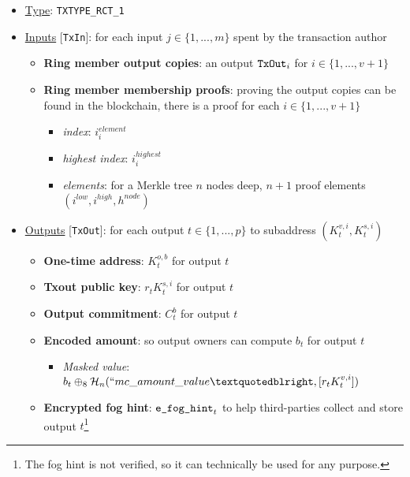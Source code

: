\begin{itemize}
    \item \underline{Type}: {\tt TXTYPE\_RCT\_1}
    \item \underline{Inputs} [{\tt TxIn}]: for each input $j \in \{1,...,m\}$ spent by the transaction author
    \begin{itemize}
        \item \textbf{Ring member output copies}: an output $\textrm{{\tt TxOut}}_i$ for $i \in \{1,...,v+1\}$
        \item \textbf{Ring member membership proofs}: proving the output copies can be found in the blockchain, there is a proof for each $i \in \{1,...,v+1\}$
        \begin{itemize}
            \item \textit{index}: $i^{element}_i$
            \item \textit{highest index}: $i^{highest}_i$
            \item \textit{elements}: for a Merkle tree $n$ nodes deep, $n+1$ proof elements $(i^{low}, i^{high}, h^{node})$
        \end{itemize}
    \end{itemize}

    \item \underline{Outputs} [{\tt TxOut}]: for each output $t \in \{1,...,p\}$ to subaddress $(K^{v,i}_t,K^{s,i}_t)$
    \begin{itemize}
        \item \textbf{One-time address}: $K^{o,b}_t$ for output $t$
        \item \textbf{Txout public key}: $r_t K^{s,i}_t$ for output $t$
        \item \textbf{Output commitment}: $C^{b}_t$ for output $t$
        \item \textbf{Encoded amount}: so output owners can compute $b_t$ for output $t$
        \begin{itemize}
            \item \textit{Masked value}: $b_t \oplus_8 \mathcal{H}_n(``mc\_amount\_value”, [r_t K^{v,i}_t])$
        \end{itemize}
        \item \textbf{Encrypted fog hint}: $\textrm{\tt e\_fog\_hint}_t$ to help third-parties collect and store output $t$\footnote{The fog hint is not verified, so it can technically be used for any purpose.}
    \end{itemize}


\end{itemize}
